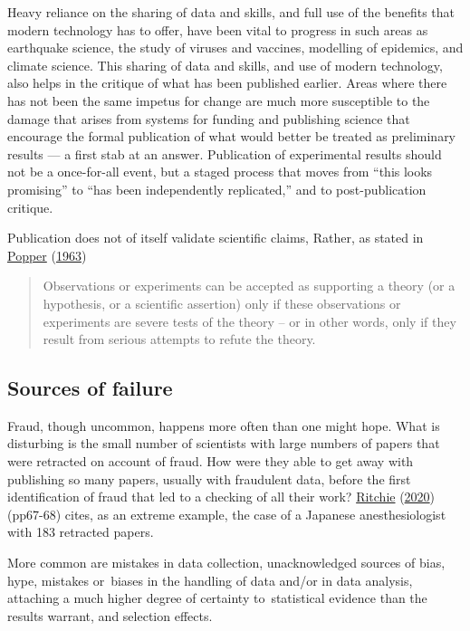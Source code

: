 \documentclass[
  10pt,
  b5paper]{book}
\begin{document}
Heavy reliance on the sharing of data and skills, and full use of
the benefits that modern technology has to offer, have been vital
to progress in such areas as earthquake science, the study of
viruses and vaccines, modelling of epidemics, and climate science.
This sharing of data and skills, and use of modern technology, also
helps in the critique of what has been published earlier.
Areas where there has not been the same impetus for change are much
more susceptible to the damage that arises from systems for funding
and publishing science that encourage the formal publication of
what would better be treated as preliminary results --- a first
stab at an answer. Publication of experimental results should not
be a once-for-all event, but a staged process that moves from
``this looks promising'' to ``has been independently replicated,''
and to post-publication critique.

Publication does not of itself validate scientific claims,
Rather, as stated in \protect\hyperlink{ref-popper_1963}{Popper} (\protect\hyperlink{ref-popper_1963}{1963})

\begin{quote}
Observations or experiments can be accepted as supporting a theory (or a hypothesis, or a scientific assertion) only if these observations or experiments are severe tests of the theory -- or in other words, only if they result from serious attempts to refute the theory.
\end{quote}

\hypertarget{sources-of-failure}{%
\subsection*{Sources of failure}\label{sources-of-failure}}

Fraud, though uncommon, happens more often than one might hope.
What is disturbing is the small number of scientists with
large numbers of papers that were retracted on account of
fraud. How were they able to get away with publishing so
many papers, usually with fraudulent data, before the
first identification of fraud that led to a checking of all
their work? \protect\hyperlink{ref-ritchie2020science}{Ritchie} (\protect\hyperlink{ref-ritchie2020science}{2020}) (pp67-68) cites, as an
extreme example, the case of a Japanese anesthesiologist
with 183 retracted papers.

More common are mistakes in data collection, unacknowledged
sources of bias, hype, mistakes or~biases in the handling of
data and/or in data analysis, attaching a much higher
degree of certainty to~statistical evidence than the results
warrant, and selection effects.
\end{document}
